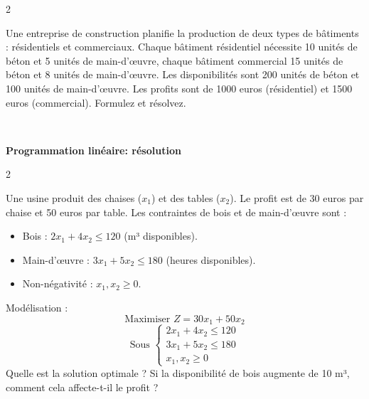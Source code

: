 \begin{multicols}{2}
\begin{exercice}
	Une entreprise de construction planifie la production de deux types de bâtiments : résidentiels et commerciaux. Chaque bâtiment résidentiel nécessite 10 unités de béton et 5 unités de main-d'œuvre, chaque bâtiment commercial 15 unités de béton et 8 unités de main-d'œuvre. Les disponibilités sont 200 unités de béton et 100 unités de main-d'œuvre. Les profits sont de 1000 euros (résidentiel) et 1500 euros (commercial). Formulez et résolvez.
\end{exercice}

\end{multicols}
\quad\\
\begin{center}
\textbf{{\large Programmation linéaire: résolution}}
\end{center}
\begin{multicols}{2}

\begin{exercice}
	Une usine produit des chaises (\(x_1\)) et des tables (\(x_2\)). Le profit est de 30 euros par chaise et 50 euros par table. Les contraintes de bois et de main-d'œuvre sont :
	\begin{itemize}
		\item Bois : \(2x_1 + 4x_2 \leq 120\) (m³ disponibles).
		\item Main-d'œuvre : \(3x_1 + 5x_2 \leq 180\) (heures disponibles).
		\item Non-négativité : \(x_1, x_2 \geq 0\).
	\end{itemize}
	Modélisation :
	\[
	\text{Maximiser } Z = 30x_1 + 50x_2
	\]
	\[
	\text{Sous } \begin{cases}
	2x_1 + 4x_2 \leq 120 \\
	3x_1 + 5x_2 \leq 180 \\
	x_1, x_2 \geq 0
	\end{cases}
	\]
	Quelle est la solution optimale ? Si la disponibilité de bois augmente de 10 m³, comment cela affecte-t-il le profit ?
\end{exercice}


\end{multicols}

